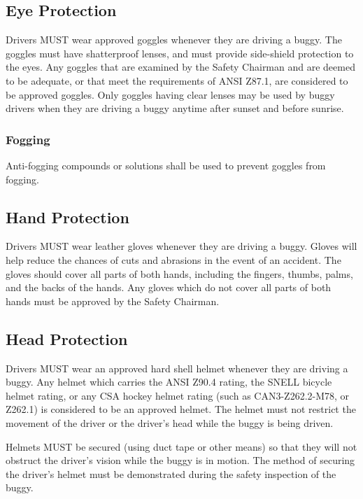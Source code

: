 \subsection{Eye Protection}

	Drivers MUST wear approved goggles whenever they are driving a buggy. The
	goggles must have shatterproof lenses, and must provide side-shield protection
	to the eyes. Any goggles that are examined by the Safety Chairman and are
	deemed to be adequate, or that meet the requirements of ANSI Z87.1, are
	considered to be approved goggles. Only goggles having clear lenses may be used
	by buggy drivers when they are driving a buggy anytime after sunset and before
	sunrise.

\subsubsection{Fogging}
	Anti-fogging compounds or solutions shall be used to prevent goggles from fogging.

\subsection{Hand Protection}

	Drivers MUST wear leather gloves whenever they are driving a buggy. Gloves will
	help reduce the chances of cuts and abrasions in the event of an accident. The
	gloves should cover all parts of both hands, including the fingers, thumbs,
	palms, and the backs of the hands. Any gloves which do not cover all parts of
	both hands must be approved by the Safety Chairman.

\subsection{Head Protection}

	Drivers MUST wear an approved hard shell helmet whenever they are driving a
	buggy. Any helmet which carries the ANSI Z90.4 rating, the SNELL bicycle helmet
	rating, or any CSA hockey helmet rating (such as CAN3-Z262.2-M78, or Z262.1) is
	considered to be an approved helmet. The helmet must not restrict the movement
	of the driver or the driver's head while the buggy is being driven.

	Helmets MUST be secured (using duct tape or other means) so that they will not
	obstruct the driver's vision while the buggy is in motion. The method of
	securing the driver's helmet must be demonstrated during the safety inspection
	of the buggy.
	
